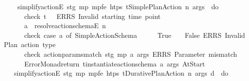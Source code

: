 \begin{isabellebody}
\ \ \ \ {\isachardoublequoteopen}simplify{\isacharunderscore}{\kern0pt}actionE\ stg\ mp\ mp{\isacharunderscore}{\kern0pt}fe\ htps\ {\isacharparenleft}{\kern0pt}t\isactrlsub {\isasympi}{\isacharcomma}{\kern0pt}Simple{\isacharunderscore}{\kern0pt}Plan{\isacharunderscore}{\kern0pt}Action\ n\ args{\isacharparenright}{\kern0pt}\ {\isacharequal}{\kern0pt}\ do\ {\isacharbraceleft}{\kern0pt}\isanewline
\ \ \ \ \ \ check\ {\isacharparenleft}{\kern0pt}t\isactrlsub {\isasympi}\ {\isasymge}\ {}{\isacharparenright}{\kern0pt}\ {\isacharparenleft}{\kern0pt}ERRS\ {\isacharprime}{\kern0pt}{\isacharprime}{\kern0pt}Invalid\ starting\ time\ point{\isacharprime}{\kern0pt}{\isacharprime}{\kern0pt}{\isacharparenright}{\kern0pt}{\isacharsemicolon}{\kern0pt}\isanewline
\ \ \ \ \ \ a\ {\isasymleftarrow}\ resolve{\isacharunderscore}{\kern0pt}action{\isacharunderscore}{\kern0pt}schemaE\ n{\isacharsemicolon}{\kern0pt}\isanewline
\ \ \ \ \ \ check\ {\isacharparenleft}{\kern0pt}case\ a\ of\ Simple{\isacharunderscore}{\kern0pt}Action{\isacharunderscore}{\kern0pt}Schema\ {\isacharunderscore}{\kern0pt}\ {\isacharunderscore}{\kern0pt}\ {\isacharunderscore}{\kern0pt}\ {\isacharunderscore}{\kern0pt}\ {\isasymRightarrow}\ True\ {\isacharbar}{\kern0pt}\ {\isacharunderscore}{\kern0pt}\ {\isasymRightarrow}\ False{\isacharparenright}{\kern0pt}\ {\isacharparenleft}{\kern0pt}ERRS\ {\isacharprime}{\kern0pt}{\isacharprime}{\kern0pt}Invalid\ Plan\ action\ type{\isacharprime}{\kern0pt}{\isacharprime}{\kern0pt}{\isacharparenright}{\kern0pt}{\isacharsemicolon}{\kern0pt}\isanewline
\ \ \ \ \ \ check\ {\isacharparenleft}{\kern0pt}action{\isacharunderscore}{\kern0pt}params{\isacharunderscore}{\kern0pt}match{}\ stg\ mp\ a\ args{\isacharparenright}{\kern0pt}\ {\isacharparenleft}{\kern0pt}ERRS\ {\isacharprime}{\kern0pt}{\isacharprime}{\kern0pt}Parameter\ mismatch{\isacharprime}{\kern0pt}{\isacharprime}{\kern0pt}{\isacharparenright}{\kern0pt}{\isacharsemicolon}{\kern0pt}\isanewline
\ \ \ \ \ \ Error{\isacharunderscore}{\kern0pt}Monad{\isachardot}{\kern0pt}return\ {\isacharbrackleft}{\kern0pt}{\isacharparenleft}{\kern0pt}t\isactrlsub {\isasympi}{\isacharcomma}{\kern0pt}instantiate{\isacharunderscore}{\kern0pt}action{\isacharunderscore}{\kern0pt}schema\ a\ args\ At{\isacharunderscore}{\kern0pt}Start{\isacharparenright}{\kern0pt}{\isacharbrackright}{\kern0pt}\isanewline
\ \ \ \ {\isacharbraceright}{\kern0pt}{\isachardoublequoteclose}\isanewline
\ \ {\isacharbar}{\kern0pt}\ {\isachardoublequoteopen}simplify{\isacharunderscore}{\kern0pt}actionE\ stg\ mp\ mp{\isacharunderscore}{\kern0pt}fe\ htps\ {\isacharparenleft}{\kern0pt}t\isactrlsub {\isasympi}{\isacharcomma}{\kern0pt}Durative{\isacharunderscore}{\kern0pt}Plan{\isacharunderscore}{\kern0pt}Action\ n\ args\ d{\isacharparenright}{\kern0pt}\ {\isacharequal}{\kern0pt}\ do\ {\isacharbraceleft}{\kern0pt}\isanewline

\end{isabellebody}
